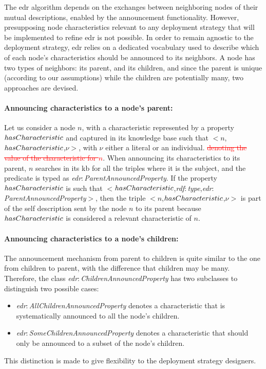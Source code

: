 \documentclass{iosart2c}
\newcommand{\removed}[1]{\textcolor{red}{\sout{#1}}}
\newcommand{\namespace}[1]{\textit{#1$:$}}
\newcommand{\concept}[2]{\namespace{#1}\-\textit{#2}}
\newcommand{\triplet}[3]{$<$#1,\textit{#2},#3$>$}
\begin{document}
The \gls{edr} algorithm depends on the exchanges between neighboring nodes of their mutual descriptions, enabled by the announcement functionality.
However, presupposing node characteristics relevant to any deployment strategy that will be implemented to refine \gls{edr} is not possible.
In order to remain agnostic to the deployment strategy, \gls{edr} relies on a dedicated vocabulary used to describe which of each node's characteristics should be announced to its neighbors. 
A node has two types of neighbors: its parent, and its children, and since the parent is unique (according to our assumptions) while the children are potentially many, two approaches are devised.

\paragraph{Announcing characteristics to a node's parent:}
Let us consider a node $n$, with a characteristic represented by a property $has\-Charac\-teris\-tic$ and captured in its knowledge base such that \triplet{$n$}{$has\-Charac\-teris\-tic$}{$\nu$}, with $\nu$ either a literal or an individual. \removed{denoting the value of the characteristic for $n$}.
When announcing its characteristics to its parent, $n$ searches in its \gls{kb} for all the triples where it is the subject, and the predicate is typed as \concept{edr}{Parent\-Announced\-Property}.
If the property $has\-Charac\-teris\-tic$ is such that \triplet{$has\-Charac\-teris\-tic$}{\concept{rdf}{type}}{\concept{edr}{Parent\-Announced\-Property}}, then the triple \triplet{$n$}{$has\-Charac\-teris\-tic$}{$\nu$} is part of the self description sent by the node $n$ to its parent because $has\-Charac\-teris\-tic$ is considered a relevant characteristic of $n$.

\paragraph{Announcing characteristics to a node's children:}
The announcement mechanism from parent to children is quite similar to the one from children to parent, with the difference that children may be many.
Therefore, the class \concept{edr}{Children\-Announced\-Property} has two subclasses to distinguish two possible cases:
\begin{itemize}
	\item \concept{edr}{All\-Children\-Announced\-Property} denotes a characteristic that is systematically announced to all the node's children.
	\item \concept{edr}{Some\-Children\-Announced\-Property} denotes a characteristic that should only be announced to a subset of the node's children. 
\end{itemize}
This distinction is made to give flexibility to the deployment strategy designers.
\end{document}
